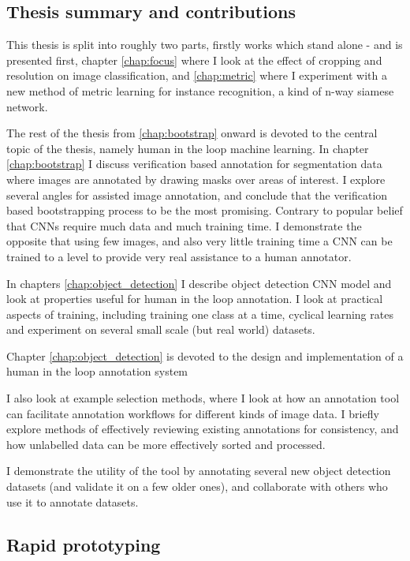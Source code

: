 \subsection {Thesis summary and contributions}

This thesis is split into roughly two parts, firstly works which stand alone - and is presented first, chapter \ref{chap:focus} where I look at the effect of cropping and resolution on image classification, and \ref{chap:metric} where I experiment with a new method of metric learning for instance recognition, a kind of n-way siamese network. 

The rest of the thesis from \ref{chap:bootstrap} onward is devoted to the central topic of the thesis, namely human in the loop machine learning. In chapter \ref{chap:bootstrap} I discuss verification based annotation for segmentation data where images are annotated by drawing masks over areas of interest. I explore several angles for assisted image annotation, and conclude that the verification based bootstrapping process to be the most promising. Contrary to popular belief that \gls{CNN}s require much data and much training time. I demonstrate the opposite that using few images, and also very little training time a \gls{CNN} can be trained to a level to provide very real assistance to a human annotator. 

In chapters \ref{chap:object_detection} I describe  object detection \gls{CNN} model and look at properties useful for human in the loop annotation. I look at practical aspects of training, including training one class at a time, cyclical learning rates and experiment on several small scale (but real world) datasets. 


Chapter \ref{chap:object_detection} is devoted to the design and implementation of a human in the loop annotation system 

I also look at example selection methods, where I look at how an annotation tool can facilitate annotation workflows for different kinds of image data. I briefly explore methods of effectively reviewing existing annotations for consistency, and how unlabelled data can be more effectively sorted and processed.

I demonstrate the utility of the tool by annotating several new object detection datasets (and validate it on a few older ones),  and collaborate with others who use it to annotate datasets.



\subsection {Rapid prototyping}

